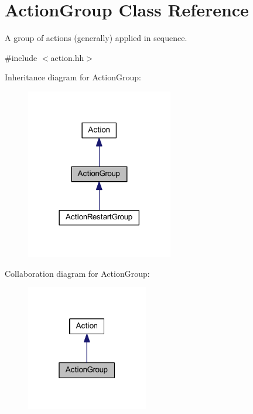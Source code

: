 \hypertarget{class_action_group}{}\section{Action\+Group Class Reference}
\label{class_action_group}


A group of actions (generally) applied in sequence.  




{\ttfamily \#include $<$action.\+hh$>$}



Inheritance diagram for Action\+Group\+:
\nopagebreak
\begin{figure}[H]
\begin{center}
\leavevmode
\includegraphics[width=182pt]{class_action_group__inherit__graph}
\end{center}
\end{figure}


Collaboration diagram for Action\+Group\+:
\nopagebreak
\begin{figure}[H]
\begin{center}
\leavevmode
\includegraphics[width=151pt]{class_action_group__coll__graph}
\end{center}
\end{figure}
